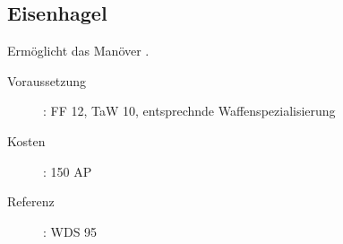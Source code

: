 \subsection{Eisenhagel}
\label{sf.eisenhagel}
Ermöglicht das Manöver .
\begin{description}
    \item[Voraussetzung]:
        FF 12, TaW  10, entsprechnde Waffenspezialisierung
    \item [Kosten]:
        150 AP
    \item [Referenz]:
        WDS 95
\end{description}
